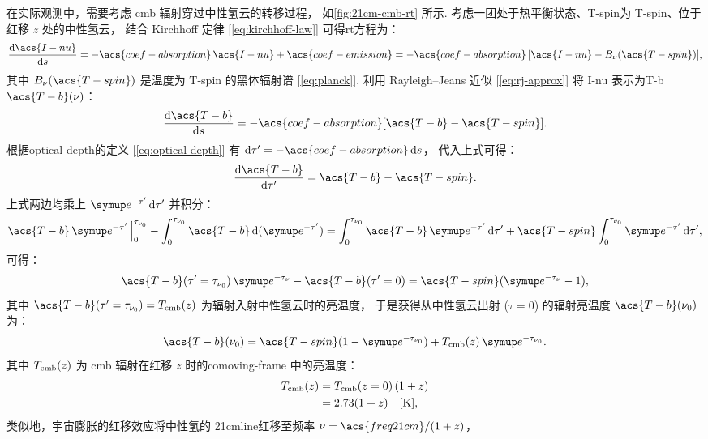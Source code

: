 在实际观测中，需要考虑 \ac{cmb} 辐射穿过中性氢云的转移过程，
如\autoref{fig:21cm-cmb-rt} 所示.
考虑一团处于热平衡状态、\acl{T-spin}为 \acs{T-spin}、位于红移 $z$ 处的中性氢云，
结合 Kirchhoff 定律 [\autoref{eq:kirchhoff-law}] 可得\ac{rt}方程为：
\begin{equation}
  \diff{\acs{I-nu}}{s}
    = -\acs{coef-absorption}\,\acs{I-nu} + \acs{coef-emission}
    = -\acs{coef-absorption}\,[\acs{I-nu} - B_{\nu}(\acs{T-spin})] ,
\end{equation}
其中
$B_{\nu}(\acs{T-spin})$ 是温度为 \acs{T-spin} 的黑体辐射谱 [\autoref{eq:planck}].
利用 Rayleigh--Jeans 近似 [\autoref{eq:rj-approx}]
将 \acs{I-nu} 表示为\acl{T-b} $\acs{T-b}(\nu)$：
\begin{equation}
  \diff{\acs{T-b}}{s}
    = -\acs{coef-absorption} [\acs{T-b} - \acs{T-spin}] .
\end{equation}
根据\acl{optical-depth}的定义 [\autoref{eq:optical-depth}]
有 $\D{\tau'} = -\acs{coef-absorption}\,\D{s}$，
代入上式可得：
\begin{equation}
  \diff{\acs{T-b}}{\tau'} = \acs{T-b} - \acs{T-spin} .
\end{equation}
上式两边均乘上 $\Ce^{-\tau'}\,\D{\tau'}$ 并积分：
\begin{equation}
  \acs{T-b}\,\Ce^{-\tau'}\,\Big|_0^{\tau_{\nu_0}}
      - \int_0^{\tau_{\nu_0}} \acs{T-b}\,\D{(\Ce^{-\tau'})}
    = \int_0^{\tau_{\nu_0}} \acs{T-b}\,\Ce^{-\tau'}\,\D{\tau'}
      + \acs{T-spin} \int_0^{\tau_{\nu_0}} \Ce^{-\tau'}\,\D{\tau'} ,
\end{equation}
可得：
\begin{equation}
  \acs{T-b}(\tau'=\tau_{\nu_0})\,\Ce^{-\tau_{\nu}} - \acs{T-b}(\tau'=0)
    = \acs{T-spin} (\Ce^{-\tau_{\nu}} - 1) ,
\end{equation}
其中 $\acs{T-b}(\tau'=\tau_{\nu_0}) = T_{\R{cmb}}(z)$
为辐射入射中性氢云时的亮温度，
于是获得从中性氢云出射 ($\tau = 0$) 的辐射亮温度 $\acs{T-b}(\nu_0)$ 为：
\begin{equation}
  \acs{T-b}(\nu_0)
    = \acs{T-spin} (1 - \Ce^{-\tau_{\nu_0}})
      + T_{\R{cmb}}(z) \,\Ce^{-\tau_{\nu_0}} .
\end{equation}
其中 $T_{\mathrm{cmb}}(z)$ 为 \ac{cmb} 辐射在红移 $z$ 时的\ac{comoving-frame}
中的亮温度：
\begin{align}
  T_{\mathrm{cmb}}(z)
    & = T_{\mathrm{cmb}}(z=0)\,(1+z)  \\
    & = 2.73 (1+z) \quad [\si{\kelvin}] ,
\end{align}
类似地，宇宙膨胀的红移效应将中性氢的 \ac{21cmline}红移至频率
$\nu = \acs{freq21cm}/(1+z)$，
